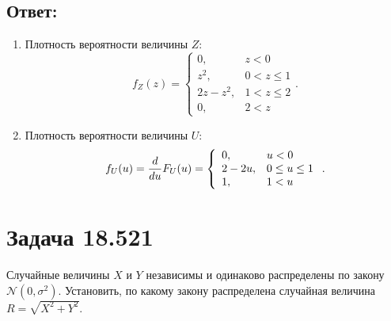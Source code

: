 \subsection*{Ответ:}
\begin{enumerate}
    \item Плотность вероятности величины $Z$:
    $$
    f_Z(z)
    = \left \{
    \begin{array}{ll}
        0,        & z < 0       \\
        z^2,      & 0 < z \le 1 \\
        2z - z^2, & 1 < z \le 2 \\
        0,        & 2 < z
    \end{array}
    \right .
    .
    $$

    \item Плотность вероятности величины $U$:
    $$
    f_U(u)
    = \frac{d}{du} F_U(u)
    = \left \{
    \begin{array}{ll}
        0,      & u < 0         \\
        2 - 2u, & 0 \le u \le 1 \\
        1,      & 1 < u
    \end{array}
    \right .
    .
    $$
\end{enumerate}


\section*{Задача 18.521}

Случайные величины $X$ и $Y$ независимы и одинаково распределены по закону $\mathcal{N}(0, \sigma^2)$. Установить, по какому закону распределена случайная величина
$R = \sqrt{X^2 + Y^2}$.
